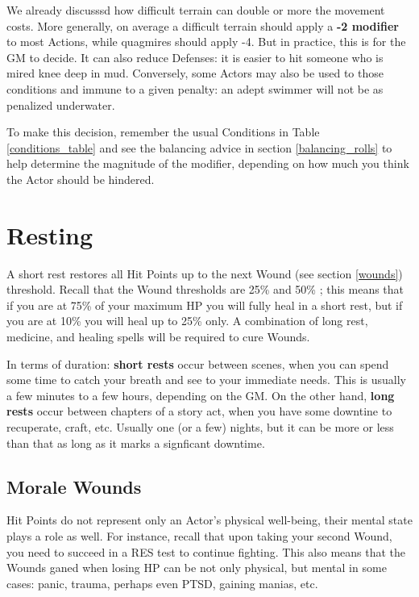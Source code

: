 We already discusssd how difficult terrain can double or more the movement costs. More generally, on average a difficult terrain should apply a \textbf{-2 modifier} to most Actions, while quagmires should apply -4. But in practice, this is for the GM to decide. It can also reduce Defenses: it is easier to hit someone who is mired knee deep in mud. Conversely, some Actors may also be used to those conditions and immune to a given penalty: an adept swimmer will not be as penalized underwater.

To make this decision, remember the usual Conditions in Table \ref{conditions_table} and see the balancing advice in section \ref{balancing_rolls} to help determine the magnitude of the modifier, depending on how much you think the Actor should be hindered.


\section{Resting}

A short rest restores all Hit Points up to the next Wound (see section \ref{wounds}) threshold. Recall that the Wound thresholds are 25\% and 50\% ;  this means that if you are at 75\% of your maximum HP you will fully heal in a short rest, but if you are at 10\% you will heal up to 25\% only. A combination of long rest, medicine, and healing spells will be required to cure Wounds.

In terms of duration: \textbf{short rests} occur between scenes, when you can spend some time to catch your breath and see to your immediate needs. This is usually a few minutes to a few hours, depending on the GM. On the other hand, \textbf{long rests} occur between chapters of a story act, when you have some downtine to recuperate, craft, etc. Usually one (or a few) nights, but it can be more or less than that as long as it marks a signficant downtime.


\subsection{Morale Wounds}

Hit Points do not represent only an Actor's physical well-being, their mental state plays a role as well. For instance, recall that upon taking your second Wound, you need to succeed in a RES test to continue fighting. This also means that the Wounds ganed when losing HP can be not only physical, but mental in some cases: panic, trauma, perhaps even PTSD, gaining manias, etc.

